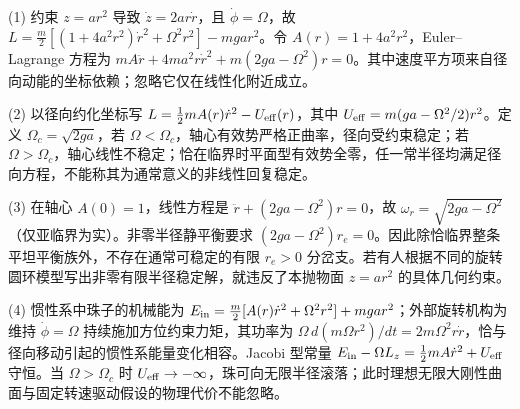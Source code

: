 (1) 约束 \(z=ar^2\) 导致 \(\dot z=2ar\dot r\)，且 \(\dot\phi=\Omega\)，故 \(L=\frac m2[(1+4a^2r^2)\dot r^2+\Omega^2r^2]-mg ar^2\)。令 \(A(r)=1+4a^2r^2\)，Euler--Lagrange 方程为 \(mA\ddot r+4ma^2r\dot r^2+m(2ga-\Omega^2)r=0\)。其中速度平方项来自径向动能的坐标依赖；忽略它仅在线性化附近成立。

(2) 以径向约化坐标写 \(L=\frac12mA(r)\dot r^2-U_{\rm eff}(r)\)，其中 \(U_{\rm eff}=m(ga-\Omega^2/2)r^2\)。定义 \(\Omega_c=\sqrt{2ga}\)，若 \(\Omega<\Omega_c\)，轴心有效势严格正曲率，径向受约束稳定；若 \(\Omega>\Omega_c\)，轴心线性不稳定；恰在临界时平面型有效势全零，任一常半径均满足径向方程，不能称其为通常意义的非线性回复稳定。

(3) 在轴心 \(A(0)=1\)，线性方程是 \(\ddot r+(2ga-\Omega^2)r=0\)，故 \(\omega_r=\sqrt{2ga-\Omega^2}\)（仅亚临界为实）。非零半径静平衡要求 \((2ga-\Omega^2)r_e=0\)。因此除恰临界整条平坦平衡族外，不存在通常可稳定的有限 \(r_e>0\) 分岔支。若有人根据不同的旋转圆环模型写出非零有限半径稳定解，就违反了本抛物面 \(z=ar^2\) 的具体几何约束。

(4) 惯性系中珠子的机械能为 \(E_{\rm in}=\frac m2[A(r)\dot r^2+\Omega^2r^2]+mg ar^2\)；外部旋转机构为维持 \(\dot\phi=\Omega\) 持续施加方位约束力矩，其功率为 \(\Omega\,d(m\Omega r^2)/dt=2m\Omega^2r\dot r\)，恰与径向移动引起的惯性系能量变化相容。Jacobi 型常量 \(E_{\rm in}-\Omega L_z=\frac12mA\dot r^2+U_{\rm eff}\) 守恒。当 \(\Omega>\Omega_c\) 时 \(U_{\rm eff}\to-\infty\)，珠可向无限半径滚落；此时理想无限大刚性曲面与固定转速驱动假设的物理代价不能忽略。
